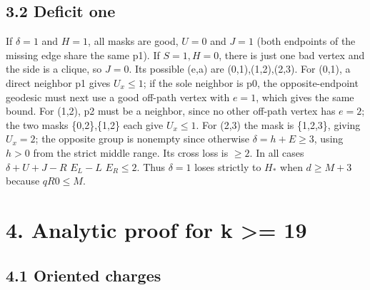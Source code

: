 \documentclass[
  11pt,
]{article}
\begin{document}
\subsection{3.2 Deficit one}\label{deficit-one}

If \(\delta =1\) and \(H=1\), all masks are good, \(U=0\) and \(J=1\)
(both endpoints of the missing edge share the same p1). If \(S=1,H=0\),
there is just one bad vertex and the side is a clique, so \(J=0\). Its
possible (e,a) are (0,1),(1,2),(2,3). For (0,1), a direct neighbor p1
gives \(U_{x}\le 1\); if the sole neighbor is p0, the opposite-endpoint
geodesic must next use a good off-path vertex with \(e=1\), which gives
the same bound. For (1,2), p2 must be a neighbor, since no other
off-path vertex has \(e=2\); the two masks \{0,2\},\{1,2\} each give
\(U_{x}\le 1\). For (2,3) the mask is \{1,2,3\}, giving \(U_{x}=2\); the
opposite group is nonempty since otherwise \(\delta =h+E\ge 3\), using
\(h>0\) from the strict middle range. Its cross loss is \(\ge 2\). In
all cases \(\delta +U+J-R\) \(E_{L}-L\) \(E_{R}\le 2\). Thus
\(\delta =1\) loses strictly to \(H_*\) when \(d\ge M+3\) because
\(qR0\le M\).

\section{4. Analytic proof for k \textgreater=
19}\label{analytic-proof-for-k-19}

\subsection{4.1 Oriented charges}\label{oriented-charges}
\end{document}
